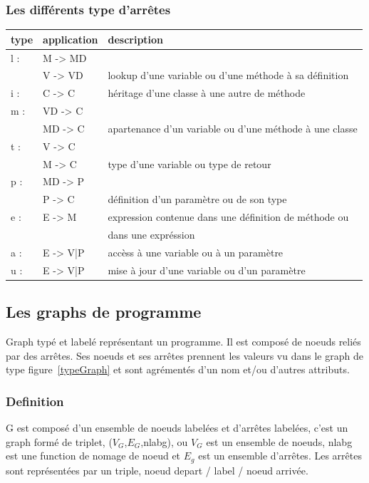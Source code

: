 \documentclass[a4paper, 12pt]{article}
\begin{document}
\subsubsection{Les différents type d'arrêtes}
  \begin{tabular}{ | l | l |  l |}
    \hline type & application & description  \\ \hline
    l : & M -> MD & \\ & V -> VD & lookup d'une variable ou d'une méthode à sa définition  \\ \hline 
    i : & C -> C &  héritage d'une classe à une autre de méthode    \\ \hline
    m : & VD -> C & \\ & MD -> C & apartenance d'un variable ou d'une méthode à une classe    \\ \hline
    t : & V -> C  & \\ &  M -> C & type d'une variable ou type de retour    \\ \hline
    p : & MD -> P  & \\ &  P -> C & définition d'un paramètre ou de son type     \\ \hline
    e : & E -> M & expression contenue dans une définition de méthode ou \\ & &  dans une expréssion    \\ \hline
    a : & E -> {V|P} & accèss à une variable ou à un paramètre    \\ \hline
    u : & E -> {V|P} & mise à jour d'une variable ou d'un paramètre    \\ \hline
   \end{tabular}


\subsection{Les graphs de programme} 

Graph typé et labelé représentant un programme. Il est composé de noeuds reliés par des arrêtes. Ses noeuds et ses arrêtes prennent les valeurs vu dans le graph de type figure~\ref{typeGraph} et sont agrémentés d'un nom et/ou d'autres attributs.

\subsubsection{Definition}
G est composé d'un ensemble de noeuds labelées et d'arrêtes labelées, c'est un graph formé de triplet, ({$V_G$},{$E_G$},nlabg), ou {$V_G$} est un ensemble de noeuds, nlabg est une function de nomage de noeud et {$E_g$} est un ensemble d'arrêtes. Les arrêtes sont représentées par un triple, noeud depart / label / noeud arrivée.
\end{document}
